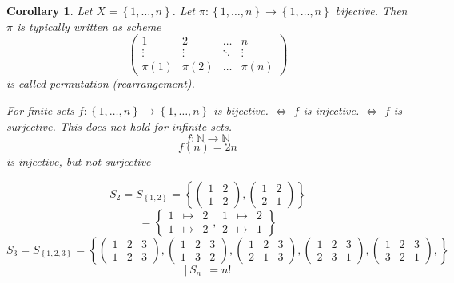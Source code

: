 \documentclass[a4paper,landscape,twocolumn]{article}
\newcommand\set[1]{\left\{#1\right\}}
\newcommand\card[1]{\left|\,#1\,\right|}
\newtheorem{cor}{Corollary}
\begin{document}
\begin{cor}
  Let $X = \set{1, \ldots, n}$. Let $\pi: \set{1, \ldots, n} \rightarrow \set{1, \ldots, n}$ bijective.
  Then $\pi$ is typically written as scheme
  \[
    \begin{pmatrix}
       1 & 2 & \ldots & n \\
       \vdots & \vdots & \ddots & \vdots \\
       \pi(1) & \pi(2) & \ldots & \pi(n)
    \end{pmatrix}
  \]
  is called \emph{permutation} (rearrangement).

  For finite sets $f: \set{1, \ldots, n} \rightarrow \set{1, \ldots, n}$ is bijective.
  $\Leftrightarrow$ $f$ is injective. $\Leftrightarrow$ $f$ is surjective.
  This does not hold for infinite sets.
  \[ f: \mathbb{N} \rightarrow \mathbb{N} \]
  \[ f(n) = 2n \]
  is injective, but not surjective
\end{cor}

\[
  S_2
    = S_{\set{1,2}}
    = \set{\begin{pmatrix} 1 & 2 \\ 1 & 2 \end{pmatrix}, \begin{pmatrix} 1 & 2 \\ 2 & 1 \end{pmatrix}}
\] \[
  =
  \set{\begin{array}{ccc} 1 & \mapsto & 2 \\ 1 & \mapsto & 2 \end{array}, \begin{array}{ccc} 1 & \mapsto & 2 \\ 2 & \mapsto & 1 \end{array}}
\] \[
  S_3
    = S_{\set{1,2,3}}
    = \set{
      \begin{pmatrix} 1 & 2 & 3 \\ 1 & 2 & 3 \end{pmatrix},
      \begin{pmatrix} 1 & 2 & 3 \\ 1 & 3 & 2 \end{pmatrix},
      \begin{pmatrix} 1 & 2 & 3 \\ 2 & 1 & 3 \end{pmatrix},
      \begin{pmatrix} 1 & 2 & 3 \\ 2 & 3 & 1 \end{pmatrix},
      \begin{pmatrix} 1 & 2 & 3 \\ 3 & 2 & 1 \end{pmatrix},
    }
\] \[
  \card{S_n} = n!
\]
\end{document}

